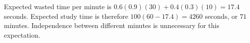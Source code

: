 Expected wasted time per minute is $0.6(0.9)(30)+0.4(0.3)(10)=17.4$ seconds. Expected study time is therefore $100(60-17.4)=4260$ seconds, or $\boxed{71}$ minutes. Independence between different minutes is unnecessary for this expectation.
